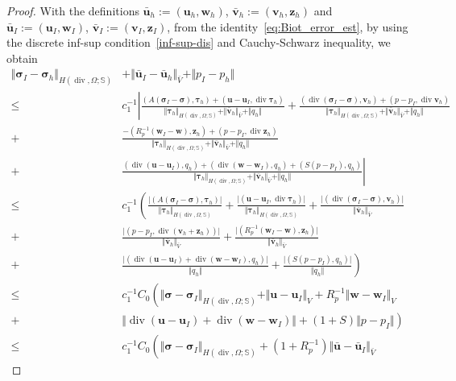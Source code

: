 \documentclass[11pt]{amsart}
\theoremstyle{remark}
\theoremstyle{definition}
\def\sig{{\bm \sigma}}
\def\btau{{\bm \tau}}
\def\bu{{\boldsymbol u}}
\def\bv{{\boldsymbol v}}
\def\bw{{\boldsymbol w}}
\renewcommand{\div}{\operatorname{div}}
\renewcommand{\div}{\operatorname{div}}
\def\sig{\boldsymbol \sigma}
\def\bu{\boldsymbol u}
\def\bv{\boldsymbol v}
\def\bw{\boldsymbol w}
\def\bz{\boldsymbol z}
\begin{document}
\begin{proof}
With the definitions $\bar{\bu}_h :=(\bu_h,\bw_h)$, $\bar{\bv}_h :=(\bv_h,\bz_h)$ and $\bar{\bu}_I :=(\bu_I,\bw_I)$, $\bar{\bv}_I :=(\bv_I,\bz_I)$, from the identity~\eqref{eq:Biot_error_est}, by using the discrete inf-sup condition~\eqref{inf-sup-dis} and Cauchy-Schwarz inequality, we obtain
%
\begin{align*}
\Vert \sig_I - \sig_h \Vert_{H(\div,\Omega;\mathbb{S})} &+ \Vert \bar{\bu}_I - \bar{\bu}_h \Vert_{\bar{V}} +  \Vert p_I - p_h \Vert \\
\le &
c_1^{-1} \left\lvert
\frac{(A (\sig_I-\sig), \bm \tau_h) + (\bu-\bu_I,\div \bm \tau_h)}
{\Vert \btau_h \Vert_{H(\div,\Omega;\mathbb{S})}+ \Vert \bar{\bv}_h \Vert_{\bar{V}} + \Vert q_h \Vert} \right. 
+  \frac{(\div (\sig_I-\sig),\bv_h) + (p-p_I, \div \bv_h)}
{\Vert \btau_h \Vert_{H(\div,\Omega;\mathbb{S})}+ \Vert \bar{\bv}_h \Vert_{\bar{V}} + \Vert q_h \Vert}  \\
+ & \frac{-(R_p^{-1}  (\bw_I-\bw), \bz_h) + (p-p_I,\div \bz_h)}
{\Vert \btau_h \Vert_{H(\div,\Omega;\mathbb{S})}+ \Vert \bar{\bv}_h \Vert_{\bar{V}} + \Vert q_h \Vert}  \\
+ & \left. \frac{(\div (\bu-\bu_I), q_h) + (\div (\bw -\bw_I), q_h) + (S (p-p_I),q_h)}
{\Vert \btau_h \Vert_{H(\div,\Omega;\mathbb{S})}+ \Vert \bar{\bv}_h \Vert_{\bar{V}} + \Vert q_h \Vert} \right\rvert \\
\le &
c_1^{-1}  \left(
\frac{\lvert(A (\sig_I-\sig), \bm \tau_h)\rvert}{\Vert \btau_h \Vert_{H(\div,\Omega;\mathbb{S})}}
+ \frac{\lvert(\bu-\bu_I,\div \bm \tau_h)\rvert}{\Vert \btau_h \Vert_{H(\div,\Omega;\mathbb{S})}} \right. 
+  \frac{\lvert(\div (\sig_I-\sig),\bv_h)\rvert}{\Vert \bar{\bv}_h \Vert_{\bar{V}}}\\
+& \frac{\lvert(p-p_I, \div (\bv_h + \bz_h))\rvert}{\Vert \bar{\bv}_h \Vert_{\bar{V}}} 
+  \frac{\lvert(R_p^{-1}(\bw_I-\bw), \bz_h)\rvert}{\Vert \bar{\bv}_h \Vert_{\bar{V}}} \\
+ & \left. \frac{\lvert(\div (\bu-\bu_I) + \div (\bw-\bw_I), q_h)\rvert}{\Vert q_h \Vert}
+ \frac{\lvert (S (p-p_I),q_h)\rvert}{\Vert q_h \Vert} \right) \\
\le & c_1^{-1}C_0
\left(
\Vert \sig - \sig_I \Vert_{H(\div,\Omega;\mathbb{S})}
+ \Vert \bu - \bu_I \Vert_V 
+ R_p^{-1} \Vert \bw - \bw_I \Vert_V \right. \\
+ &  \left. \Vert \div (\bu-\bu_I) + \div (\bw-\bw_I) \Vert + (1+S) \Vert p-p_I \Vert \right) \\
\le &  c_1^{-1}C_0
 \left(
\Vert \sig - \sig_I \Vert_{H(\div,\Omega;\mathbb{S})}
+ (1+R_p^{-1}) \Vert \bar{\bu} - \bar{\bu}_I \Vert_{\bar{V }}

\end{align*}
\end{proof}
\end{document}
